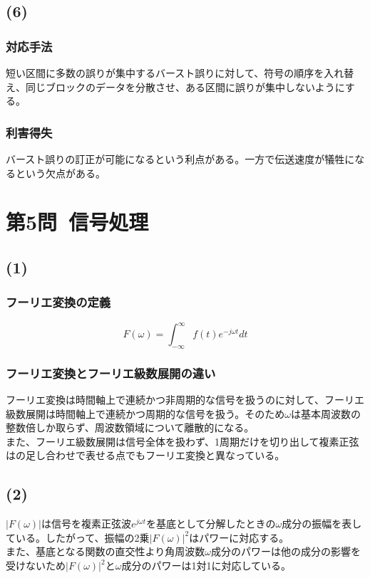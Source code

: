 \documentclass[a4paper,12pt,xelatex,ja=standard]{bxjsarticle}
\begin{document}
\subsection*{(6)}
\subsubsection*{対応手法}
短い区間に多数の誤りが集中するバースト誤りに対して、符号の順序を入れ替え、同じブロックのデータを分散させ、ある区間に誤りが集中しないようにする。

\subsubsection*{利害得失}
バースト誤りの訂正が可能になるという利点がある。一方で伝送速度が犠牲になるという欠点がある。

\section*{第5問\ 信号処理}
\subsection*{(1)}
\subsubsection*{フーリエ変換の定義}
\[
  F(\omega) = \int^{\infty}_{-\infty}f(t)e^{-j \omega t}dt
\]

\subsubsection*{フーリエ変換とフーリエ級数展開の違い}
フーリエ変換は時間軸上で連続かつ非周期的な信号を扱うのに対して、フーリエ級数展開は時間軸上で連続かつ周期的な信号を扱う。そのため$\omega$は基本周波数の整数倍しか取らず、周波数領域について離散的になる。\\
また、フーリエ級数展開は信号全体を扱わず、1周期だけを切り出して複素正弦はの足し合わせで表せる点でもフーリエ変換と異なっている。

\subsection*{(2)}
$|F(\omega)|$は信号を複素正弦波$e^{j \omega t}$を基底として分解したときの$\omega$成分の振幅を表している。したがって、振幅の2乗$|F(\omega)|^2$はパワーに対応する。\\
また、基底となる関数の直交性より角周波数$\omega$成分のパワーは他の成分の影響を受けないため$|F(\omega)|^2$と$\omega$成分のパワーは1対1に対応している。
\end{document}
